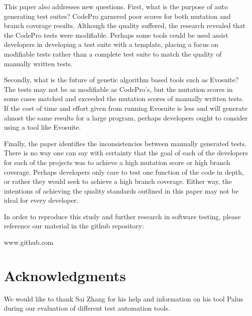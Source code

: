 \documentclass[conference]{IEEEtran}
\begin{document}
This paper also addresses new questions. First, what is the purpose of auto generating test suites? CodePro garnered poor scores for both mutation and branch coverage results. Although the quality suffered, the research revealed that the CodePro tests were modifiable. Perhaps some tools could be used assist developers in developing a test suite with a template, placing a focus on modifiable tests rather than a complete test suite to match the quality of manually written tests.

Secondly, what is the future of genetic algorithm based tools such as Evosuite? The tests may not be as modifiable as CodePro's, but the mutation scores in some cases matched and exceeded the mutation scores of manually written tests. If the cost of time and effort given from running Evosuite is less and will generate almost the same results for a large program, perhaps developers ought to consider using a tool like Evosuite.

Finally, the paper identifies the inconsistencies between manually generated tests. There is no way one can say with certainty that the goal of each of the developers for each of the projects was to achieve a high mutation score or high branch coverage. Perhaps developers only care to test one function of the code in depth, or rather they would seek to achieve a high branch coverage. Either way, the intentions of achieving the quality standards outlined in this paper may not be ideal for every developer. 

In order to reproduce this study and further research in software testing, please reference our material in the github repository:

www.github.com

\section{Acknowledgments}
\label{sec:Acknowledgments}
We would like to thank Sai Zhang for his help and information on his tool Palus during our evaluation of different test automation tools.





\end{document}
